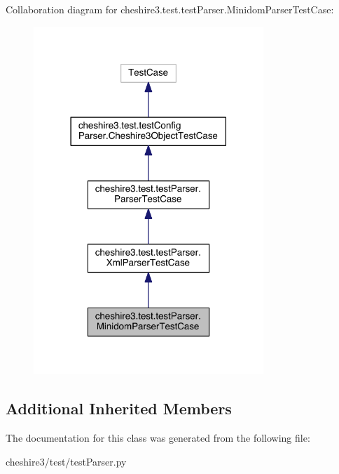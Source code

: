 Collaboration diagram for cheshire3.\-test.\-test\-Parser.\-Minidom\-Parser\-Test\-Case\-:
\nopagebreak
\begin{figure}[H]
\begin{center}
\leavevmode
\includegraphics[width=246pt]{classcheshire3_1_1test_1_1test_parser_1_1_minidom_parser_test_case__coll__graph}
\end{center}
\end{figure}
\subsection*{Additional Inherited Members}


The documentation for this class was generated from the following file\-:\begin{DoxyCompactItemize}
\item 
cheshire3/test/test\-Parser.\-py\end{DoxyCompactItemize}
